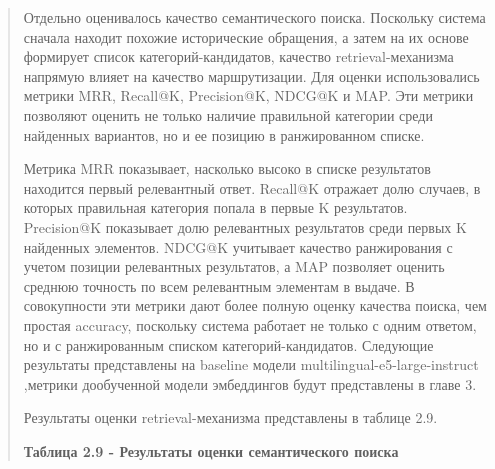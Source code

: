 \begin{quote}
Отдельно оценивалось качество семантического поиска. Поскольку система
сначала находит похожие исторические обращения, а затем на их основе
формирует список категорий-кандидатов, качество retrieval-механизма
напрямую влияет на качество маршрутизации. Для оценки использовались
метрики MRR, Recall@K, Precision@K, NDCG@K и MAP. Эти метрики позволяют
оценить не только наличие правильной категории среди найденных
вариантов, но и ее позицию в ранжированном списке.

Метрика MRR показывает, насколько высоко в списке результатов находится
первый релевантный ответ. Recall@K отражает долю случаев, в которых
правильная категория попала в первые K результатов. Precision@K
показывает долю релевантных результатов среди первых K найденных
элементов. NDCG@K учитывает качество ранжирования с учетом позиции
релевантных результатов, а MAP позволяет оценить среднюю точность по
всем релевантным элементам в выдаче. В совокупности эти метрики дают
более полную оценку качества поиска, чем простая accuracy, поскольку
система работает не только с одним ответом, но и с ранжированным списком
категорий-кандидатов. Следующие результаты представлены на baseline
модели multilingual-e5-large-instruct ,метрики дообученной модели
эмбеддингов будут представлены в главе 3.

Результаты оценки retrieval-механизма представлены в таблице 2.9.

\textbf{Таблица 2.9 - Результаты оценки семантического поиска}
\end{quote}

